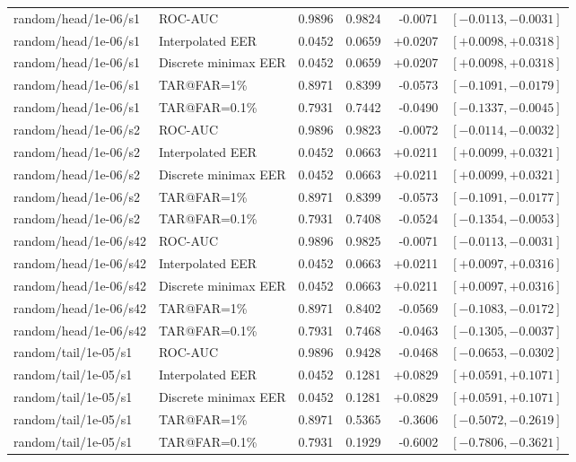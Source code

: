 \begin{table}[!t]
\begin{tabular}{@{}llrrrr@{}}
random/head/1e-06/s1 & ROC-AUC & 0.9896 & 0.9824 & -0.0071 & $[-0.0113,-0.0031]$ \\
random/head/1e-06/s1 & Interpolated EER & 0.0452 & 0.0659 & +0.0207 & $[+0.0098,+0.0318]$ \\
random/head/1e-06/s1 & Discrete minimax EER & 0.0452 & 0.0659 & +0.0207 & $[+0.0098,+0.0318]$ \\
random/head/1e-06/s1 & TAR@FAR=1\% & 0.8971 & 0.8399 & -0.0573 & $[-0.1091,-0.0179]$ \\
random/head/1e-06/s1 & TAR@FAR=0.1\% & 0.7931 & 0.7442 & -0.0490 & $[-0.1337,-0.0045]$ \\
random/head/1e-06/s2 & ROC-AUC & 0.9896 & 0.9823 & -0.0072 & $[-0.0114,-0.0032]$ \\
random/head/1e-06/s2 & Interpolated EER & 0.0452 & 0.0663 & +0.0211 & $[+0.0099,+0.0321]$ \\
random/head/1e-06/s2 & Discrete minimax EER & 0.0452 & 0.0663 & +0.0211 & $[+0.0099,+0.0321]$ \\
random/head/1e-06/s2 & TAR@FAR=1\% & 0.8971 & 0.8399 & -0.0573 & $[-0.1091,-0.0177]$ \\
random/head/1e-06/s2 & TAR@FAR=0.1\% & 0.7931 & 0.7408 & -0.0524 & $[-0.1354,-0.0053]$ \\
random/head/1e-06/s42 & ROC-AUC & 0.9896 & 0.9825 & -0.0071 & $[-0.0113,-0.0031]$ \\
random/head/1e-06/s42 & Interpolated EER & 0.0452 & 0.0663 & +0.0211 & $[+0.0097,+0.0316]$ \\
random/head/1e-06/s42 & Discrete minimax EER & 0.0452 & 0.0663 & +0.0211 & $[+0.0097,+0.0316]$ \\
random/head/1e-06/s42 & TAR@FAR=1\% & 0.8971 & 0.8402 & -0.0569 & $[-0.1083,-0.0172]$ \\
random/head/1e-06/s42 & TAR@FAR=0.1\% & 0.7931 & 0.7468 & -0.0463 & $[-0.1305,-0.0037]$ \\
random/tail/1e-05/s1 & ROC-AUC & 0.9896 & 0.9428 & -0.0468 & $[-0.0653,-0.0302]$ \\
random/tail/1e-05/s1 & Interpolated EER & 0.0452 & 0.1281 & +0.0829 & $[+0.0591,+0.1071]$ \\
random/tail/1e-05/s1 & Discrete minimax EER & 0.0452 & 0.1281 & +0.0829 & $[+0.0591,+0.1071]$ \\
random/tail/1e-05/s1 & TAR@FAR=1\% & 0.8971 & 0.5365 & -0.3606 & $[-0.5072,-0.2619]$ \\
random/tail/1e-05/s1 & TAR@FAR=0.1\% & 0.7931 & 0.1929 & -0.6002 & $[-0.7806,-0.3621]$ \\

\end{tabular}
\end{table}
